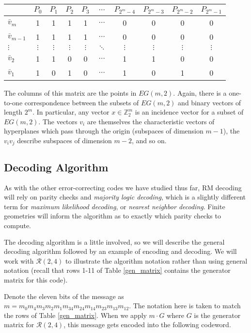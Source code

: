 \documentclass[12pt,twoside]{reedthesis}
\theoremstyle{definition}
\newcommand{\Z}{\mathbb{Z}}
\begin{document}
\begin{center}
\begin{tabular}{ l | c c c c c c c c c }
& $P_0$ & $P_1$ & $P_2$ & $P_3$ & $\ldots$ &$P_{2^m-4}$ & $P_{2^m-3}$ & $P_{2^m-2}$ & $P_{2^m-1}$\\
\hline
$\bar{v}_m$ & 1 & 1 & 1 & 1 &$\ldots$ & 0 & 0 & 0 & 0\\
$\bar{v}_{m-1}$ &1 & 1 & 1 & 1 &$\ldots$ & 0 & 0 & 0 & 0\\
$\vdots$ &$\vdots$ &$\vdots$ &$\vdots$ &$\vdots$ &$\ddots$ &$\vdots$ &$\vdots$ &$\vdots$ &$\vdots$ \\
$\bar{v}_2$ & 1 & 1 & 0 & 0 & $\ldots$ & 1 & 1 & 0 & 0\\   
$\bar{v}_1$ & 1 & 0 & 1 & 0 &$\ldots$ & 1 & 0 & 1 & 0\\   
\end{tabular}
\end{center}
The columns of this matrix are the points in $EG(m,2)$. Again, there is a one-to-one correspondence between the subsets of $EG(m,2)$ and binary vectors of length $2^m$. In particular, any vector $x \in \Z_2^m$ is an incidence vector for a subset of $EG(m,2)$. The vectors $v_i$ are themselves the characteristic vectors of hyperplanes which pass through the origin (subspaces of dimension $m-1$), the $v_iv_j$ describe subspaces of dimension $m-2$, and so on.

\subsection{Decoding Algorithm}
As with the other error-correcting codes we have studied thus far, RM decoding will rely on parity checks and \textit{majority logic decoding}, which is a slightly different term for \textit{maximum likelihood decoding}, or \textit{nearest neighbor decoding}. Finite geometries will inform the algorithm as to exactly which parity checks to compute.

The decoding algorithm is a little involved, so we will describe the general decoding algorithm followed by an example of encoding and decoding.
We will work with $\mathscr{R}(2,4)$ to illustrate the algorithm notation rather than using general notation (recall that rows 1-11 of Table \ref{gen_matrix} contains the generator matrix for this code).

Denote the eleven bits of the message as $m = m_0m_4m_3m_2m_1m_{34}m_{24}m_{14}m_{23}m_{13}m_{12}$. The notation here is taken to match the rows of Table \ref{gen_matrix}. When we apply $m \cdot G$ where $G$ is the generator matrix for $\mathscr{R}(2,4)$, this message gets encoded into the following codeword.
\end{document}

